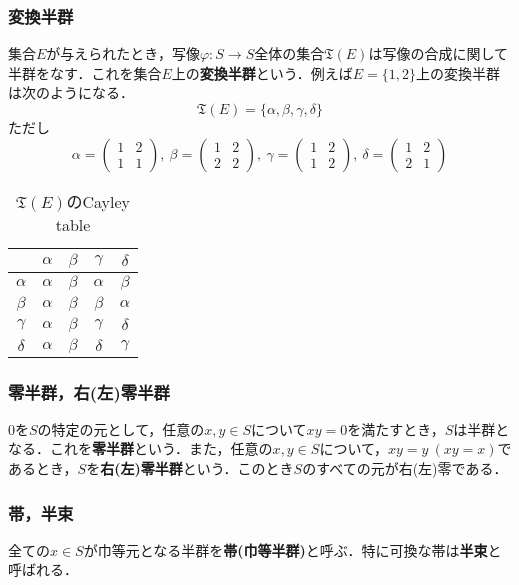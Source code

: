 \documentclass{jsarticle}
\begin{document}
\subsubsection{変換半群}
集合$E$が与えられたとき，写像$\varphi:S\rightarrow S$全体の集合${\mathfrak T}(E)$は写像の合成に関して半群をなす．これを集合$E$上の{\bf 変換半群}という．例えば$E=\{1,2\}$上の変換半群は次のようになる．$${\mathfrak T}(E)=\{\alpha, \beta,\gamma,\delta\}$$
ただし
$$
\alpha=
\begin{pmatrix}
1&2 \\
1&1
\end{pmatrix}
,\:\beta=
\begin{pmatrix}
1&2 \\
2&2
\end{pmatrix}
,\:\gamma=
\begin{pmatrix}
1&2 \\
1&2
\end{pmatrix}
,\:\delta=
\begin{pmatrix}
1&2 \\
2&1
\end{pmatrix}
$$
\begin{table}[htb]
\begin{center}
\begin{tabular}{c|cccc}
 &$\alpha$&$\beta$&$\gamma$&$\delta$ \\ \hline
$\alpha$&$\alpha$&$\beta$&$\alpha$&$\beta$ \\
$\beta$&$\alpha$&$\beta$&$\beta$&$\alpha$ \\
$\gamma$&$\alpha$&$\beta$&$\gamma$&$\delta$ \\
$\delta$&$\alpha$&$\beta$&$\delta$&$\gamma$  
\end{tabular}
\caption{${\mathfrak T}(E)$のCayley table}
\end{center}
\end{table}
\subsubsection{零半群，右(左)零半群}
$0$を$S$の特定の元として，任意の$x,y\in S$について$xy=0$を満たすとき，$S$は半群となる．これを{\bf 零半群}という．また，任意の$x,y\in S$について，$xy=y\:(xy=x)$であるとき，$S$を{\bf 右(左)零半群}という．このとき$S$のすべての元が右(左)零である．
\subsubsection{帯，半束}
全ての$x\in S$が巾等元となる半群を{\bf 帯(巾等半群)}と呼ぶ．特に可換な帯は{\bf 半束}と呼ばれる．
\end{document}
